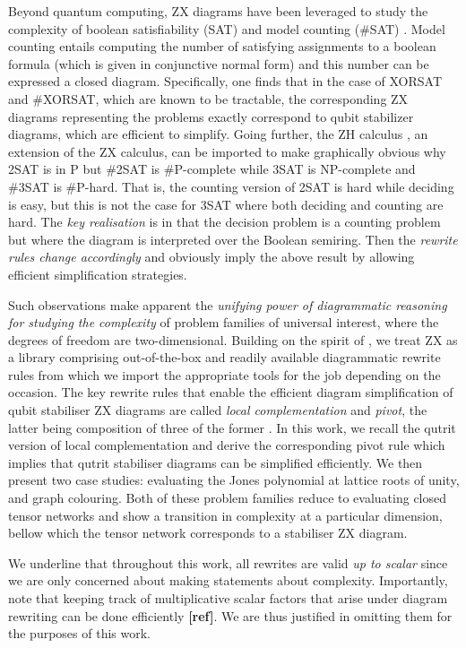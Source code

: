 Beyond quantum computing, ZX diagrams have been leveraged to study the complexity of boolean satisfiability (SAT) and model counting (\#SAT) \cite{debeaudrap2020tensor}.
Model counting entails computing the number of satisfying assignments to a boolean formula (which is given in conjunctive normal form)
and this number can be expressed a closed diagram.
Specifically, one finds that in the case of XORSAT and \#XORSAT,
which are known to be tractable,
the corresponding ZX diagrams representing the problems exactly correspond to qubit stabilizer diagrams, which are efficient to simplify.
Going further, the ZH calculus \cite{backens2018zh}, an extension of the ZX calculus, can be imported to make graphically obvious
why 2SAT is in P but \#2SAT is \#P-complete while 3SAT is NP-complete and \#3SAT is \#P-hard.
That is, the counting version of 2SAT is hard while deciding is easy, but this is not the case for 3SAT where both deciding and counting are hard.
The \emph{key realisation} is in that the decision problem is a counting problem
but where the diagram is interpreted over the Boolean semiring.
Then the \emph{rewrite rules change accordingly} and obviously imply the above result by allowing efficient simplification strategies.

Such observations make apparent the \emph{unifying power of diagrammatic reasoning
for studying the complexity} of problem families of universal interest,
where the degrees of freedom are two-dimensional.
Building on the spirit of \cite{debeaudrap2020tensor}, we treat ZX as a library comprising out-of-the-box and readily available diagrammatic rewrite rules from which we import the appropriate tools for the job depending on the occasion.
The key rewrite rules that enable the efficient diagram simplification
of qubit stabiliser ZX diagrams
are called \emph{local complementation} and \emph{pivot},
the latter being composition of three of the former \cite{graph_theoretic_simplification}.
In this work, we recall the qutrit version of local complementation and derive the corresponding pivot rule
which implies that qutrit stabiliser diagrams can be simplified efficiently.
We then present two case studies: evaluating the Jones polynomial at lattice roots of unity, and graph colouring.
Both of these problem families reduce to evaluating
closed tensor networks and show a transition in complexity
at a particular dimension, bellow which the tensor network corresponds to a stabiliser ZX diagram.

We underline that throughout this work, all rewrites are valid
\emph{up to scalar}
since we are only concerned about making statements about complexity.
Importantly, note that keeping track of multiplicative scalar factors that arise under diagram rewriting can be done efficiently {\bf [ref]}.
We are thus justified in omitting them for the purposes of this work.
